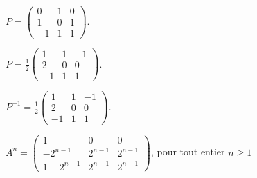 \begin{multi}
    \item* \(P= \left(\begin{array}{rcc}
0&1&0\\1&0&1\\ -1&1&1\end{array}\right).\)
    \item \(\displaystyle P= \frac{1}{2}\left(\begin{array}{rcc}
1&1&-1\\2&0&0\\ -1&1&1\end{array}\right).\)
    \item* \(\displaystyle P^{-1}= \frac{1}{2}\left(\begin{array}{rcc}
1&1&-1\\2&0&0\\ -1&1&1\end{array}\right).\)
    \item* \(A^n= \left(\begin{array}{rcc}
1&0&0\\-2^{n-1}&2^{n-1}&2^{n-1}\\
1-2^{n-1}&2^{n-1}&2^{n-1}\end{array}\right)\), pour tout entier \(n\ge1\)
\end{multi}


